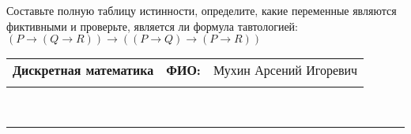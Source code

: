 \documentclass[10pt]{exam}
\newcommand{\class}{Дискретная математика}
\newcommand{\examdate}{}
\begin{document}
\begin{questions}
\begin{enumerate} [a)]
\end{enumerate}\question Составьте полную таблицу истинности, определите, какие переменные являются фиктивными и проверьте, является ли формула тавтологией:
$(P \rightarrow (Q \rightarrow R)) \rightarrow ((P \rightarrow Q) \rightarrow (P \rightarrow R))$

\end{questions}
\newpage
\begin{flushright}
\begin{tabular}{p{2.8in} r l}
\textbf{\class} & \textbf{ФИО:} &Мухин Арсений Игоревич
\\

\textbf{\examdate} &&\\
\end{tabular}\\
\end{flushright}
\rule[1ex]{\textwidth}{.1pt}
\end{document}
